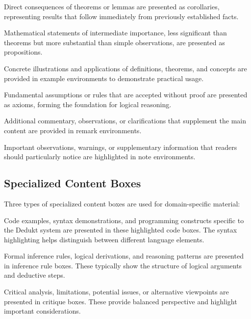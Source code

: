 \begin{corollary}
    Direct consequences of theorems or lemmas are presented as corollaries, representing results that follow immediately from previously established facts.
\end{corollary}

\begin{proposition}
    Mathematical statements of intermediate importance, less significant than theorems but more substantial than simple observations, are presented as propositions.
\end{proposition}

\begin{example}
    Concrete illustrations and applications of definitions, theorems, and concepts are provided in example environments to demonstrate practical usage.
\end{example}

\begin{axiom}
    Fundamental assumptions or rules that are accepted without proof are presented as axioms, forming the foundation for logical reasoning.
\end{axiom}

\begin{remark}
    Additional commentary, observations, or clarifications that supplement the main content are provided in remark environments.
\end{remark}

\begin{note}
    Important observations, warnings, or supplementary information that readers should particularly notice are highlighted in note environments.
\end{note}

\subsection*{Specialized Content Boxes}\label{subsec:specialized-content-boxes}

Three types of specialized content boxes are used for domain-specific material:

\begin{deduktcode}
    Code examples, syntax demonstrations, and programming constructs specific to the Dedukt system are presented in these highlighted code boxes. The syntax highlighting helps distinguish between different language elements.
\end{deduktcode}

\begin{inferenceBox}
    Formal inference rules, logical derivations, and reasoning patterns are presented in inference rule boxes.
    These typically show the structure of logical arguments and deductive steps.
\end{inferenceBox}

\begin{critique}
    Critical analysis, limitations, potential issues, or alternative viewpoints are presented in critique boxes.
    These provide balanced perspective and highlight important considerations.
\end{critique}


